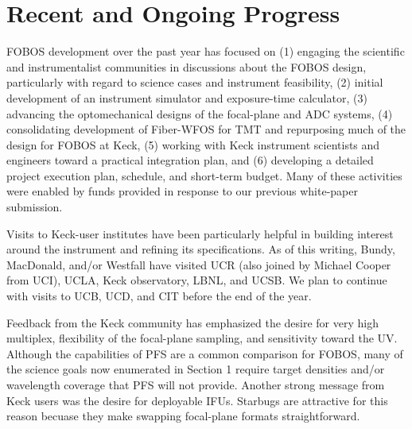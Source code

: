 

\section{Recent and Ongoing Progress}
\label{sec:progress}

FOBOS development over the past year has focused on (1) engaging the
scientific and instrumentalist communities in discussions about the
FOBOS design, particularly with regard to science cases and
instrument feasibility, (2) initial development of an instrument
simulator and exposure-time calculator, (3) advancing the
optomechanical designs of the focal-plane and ADC systems, (4)
consolidating development of Fiber-WFOS for TMT and repurposing much
of the design for FOBOS at Keck, (5) working with Keck instrument
scientists and engineers toward a practical integration plan, and (6)
developing a detailed project execution plan, schedule, and short-term budget.
Many of these activities were enabled by funds provided in response
to our previous white-paper submission.

Visits to Keck-user institutes have been particularly helpful in
building interest around the instrument and refining its
specifications. As of this writing, Bundy, MacDonald, and/or Westfall
have visited UCR (also joined by Michael Cooper from UCI), UCLA, Keck
observatory, LBNL, and UCSB. We plan to continue with visits to UCB, UCD, and CIT before the end of the year.

Feedback from the Keck community has emphasized the desire for very high multiplex, flexibility of the focal-plane
sampling, and sensitivity toward the UV. Although the capabilities of PFS are a common comparison for FOBOS, many of
the science goals now enumerated in Section 1 require target densities and/or wavelength coverage that PFS will not
provide. Another strong message from Keck users was the desire for deployable IFUs. Starbugs are attractive for this
reason becuase they make swapping focal-plane formats straightforward.


